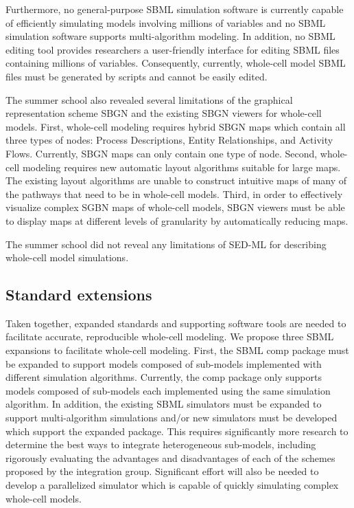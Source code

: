 \documentclass[journal,transmag]{IEEEtran}
\begin{document}
Furthermore, no general-purpose SBML simulation software is currently capable of efficiently simulating models involving millions of variables and no SBML simulation software supports multi-algorithm modeling. In addition, no SBML editing tool provides researchers a user-friendly interface for editing SBML files containing millions of variables. Consequently, currently, whole-cell model SBML files must be generated by scripts and cannot be easily edited.

The summer school also revealed several limitations of the graphical representation scheme SBGN and the existing SBGN viewers for whole-cell models. First, whole-cell modeling requires hybrid SBGN maps which contain all three types of nodes: Process Descriptions, Entity Relationships, and Activity Flows. Currently, SBGN maps can only contain one type of node. Second, whole-cell modeling requires new automatic layout algorithms suitable for large maps. The existing layout algorithms are unable to construct intuitive maps of many of the pathways that need to be in whole-cell models. Third, in order to effectively visualize complex SGBN maps of whole-cell models, SBGN viewers must be able to display maps at different levels of granularity by automatically reducing maps.

The summer school did not reveal any limitations of SED-ML for describing whole-cell model simulations.

\subsection{Standard extensions}
Taken together, expanded standards and supporting software tools are needed to facilitate accurate, reproducible whole-cell modeling. We propose three SBML expansions to facilitate whole-cell modeling. First, the SBML comp package must be expanded to support models composed of sub-models implemented with different simulation algorithms. Currently, the comp package only supports models composed of sub-models each implemented using the same simulation algorithm. In addition, the existing SBML simulators must be expanded to support multi-algorithm simulations and/or new simulators must be developed which support the expanded package. This requires significantly more research to determine the best ways to integrate heterogeneous sub-models, including rigorously evaluating the advantages and disadvantages of each of the schemes proposed by the integration group. Significant effort will also be needed to develop a parallelized simulator which is capable of quickly simulating complex whole-cell models.
\end{document}

